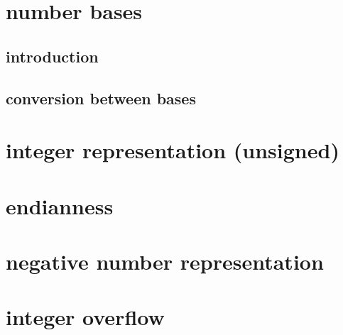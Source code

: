 
\begin{frame}
    \titlepage
\end{frame}

\section{number bases}

\subsection{introduction}


%

\subsection{conversion between bases}







\section{integer representation (unsigned)}



\section{endianness}



%

\section{negative number representation}





\section{integer overflow}

